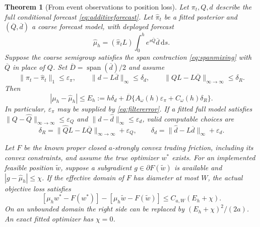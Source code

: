 \documentclass[11pt]{article}
\theoremstyle{plain}
\newtheorem{theorem}{Theorem}[section]
\theoremstyle{definition}
\theoremstyle{remark}
\newcommand{\dd}{\,\mathrm d}
\newcommand{\norm}[1]{\lVert#1\rVert}
\DeclareMathOperator{\spn}{span}
\begin{document}
\begin{theorem}[From event observations to position loss]
\label{thm:bookdecision}
Let \(\pi_t,Q,d\) describe the full conditional forecast
\eqref{eq:additiveforecast}. Let \(\widehat\pi_t\) be a fitted
posterior and \((\overline Q,\overline d)\) a coarse forecast model,
with deployed forecast
\begin{equation}\label{eq:coarseforecast}
 \widehat\mu_h=(\widehat\pi_t L)
                 \int_0^h e^{s\overline Q}\overline d\dd s.
\end{equation}
Suppose the coarse semigroup satisfies the span contraction
\eqref{eq:spanmixing} with \(\overline Q\) in place of \(Q\).
Set \(\overline D=\spn(\overline d)/2\) and assume
\[
 \norm{\pi_t-\widehat\pi_t}_1\le\varepsilon_\pi,\qquad
 \norm{d-L\overline d}_\infty\le\delta_d,\qquad
 \norm{QL-L\overline Q}_{\infty\to\infty}\le\delta_R.
\]
Then
\begin{equation}\label{eq:completebookerror}
 |\mu_h-\widehat\mu_h|\le
 E_h:=h\delta_d+\overline D\{
       A_\omega(h)\varepsilon_\pi+C_\omega(h)\delta_R\}.
\end{equation}
In particular, \(\varepsilon_\pi\) may be supplied by
\eqref{eq:filtererror}. If a fitted full model satisfies
\(\norm{Q-\widehat Q}_{\infty\to\infty}\le\varepsilon_Q\)
and \(\norm{d-\widehat d}_\infty\le\varepsilon_d\), valid
computable choices are
\begin{equation}\label{eq:computedreduction}
 \delta_R=\norm{\widehat QL-L\overline Q}_{\infty\to\infty}
               +\varepsilon_Q,\qquad
 \delta_d=\norm{\widehat d-L\overline d}_\infty+\varepsilon_d.
\end{equation}

Let \(F\) be the known proper closed \(a\)-strongly convex trading
friction, including its convex constraints, and assume the true
optimizer \(w^*\) exists. For an implemented feasible position
\(\widetilde w\), suppose a subgradient
\(g\in\partial F(\widetilde w)\) is available and
\(|g-\widehat\mu_h|\le\chi\). If the effective domain of \(F\)
has diameter at most \(W\), the actual objective loss satisfies
\begin{equation}\label{eq:completebookloss}
 [\mu_h w^*-F(w^*)]-
 [\mu_h\widetilde w-F(\widetilde w)]
 \le C_{a,W}(E_h+\chi).
\end{equation}
On an unbounded domain the right side can be replaced by
\((E_h+\chi)^2/(2a)\). An exact fitted optimizer has \(\chi=0\).
\end{theorem}
\end{document}
